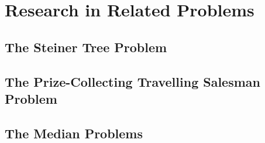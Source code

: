 \chapter{Research in Related Problems}
\label{chap:related}
\section{The Steiner Tree Problem}

\section{The Prize-Collecting Travelling Salesman Problem}

\section{The Median  Problems}


